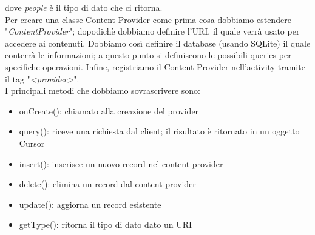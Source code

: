 dove \textit{people} è il tipo di dato che ci ritorna.\\
Per creare una classe Content Provider come prima cosa dobbiamo estendere "\textit{ContentProvider}"; dopodichè dobbiamo definire l'URI, il quale verrà usato per accedere ai contenuti. Dobbiamo così definire il database (usando SQLite) il quale conterrà le informazioni; a questo punto si definiscono le possibili queries per specifiche operazioni. Infine, registriamo il Content Provider nell'activity tramite il tag "\textit{<provider>}".\\
I principali metodi che dobbiamo sovrascrivere sono:
\begin{itemize}
    \item onCreate(): chiamato alla creazione del provider
    \item query(): riceve una richiesta dal client; il risultato è ritornato in un oggetto Cursor
    \item insert(): inserisce un nuovo record nel content provider
    \item delete(): elimina un record dal content provider
    \item update(): aggiorna un record esistente
    \item getType(): ritorna il tipo di dato dato un URI
\end{itemize}
% 
